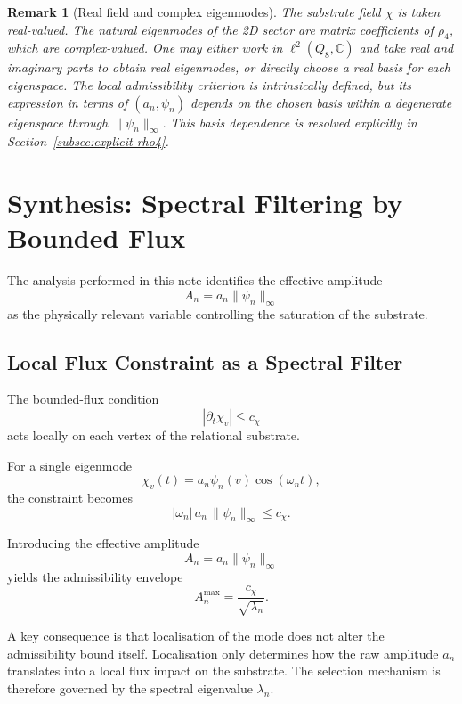 \documentclass[11pt,a4paper]{article}
\newtheorem{remark}{Remark}
\begin{document}
  \begin{remark}[Real field and complex eigenmodes]
      The substrate field $\chi$ is taken real-valued.
      The natural eigenmodes of the 2D sector are matrix coefficients of $\rho_4$,
      which are complex-valued.
      One may either work in $\ell^2(Q_8,\mathbb{C})$ and take real and imaginary parts to
      obtain real eigenmodes, or directly choose a real basis for each eigenspace.
      The local admissibility criterion is intrinsically defined, but its expression in
      terms of $(a_n,\psi_n)$ depends on the chosen basis within a degenerate eigenspace
      through $\|\psi_n\|_\infty$.
      This basis dependence is resolved explicitly in
      Section~\ref{subsec:explicit-rho4}.
  \end{remark}

  \section{Synthesis: Spectral Filtering by Bounded Flux}

  The analysis performed in this note identifies the effective amplitude
  \[
    A_n = a_n \|\psi_n\|_\infty
  \]
  as the physically relevant variable controlling the saturation of the
  substrate.

  \subsection{Local Flux Constraint as a Spectral Filter}

    The bounded-flux condition
    \[
      |\partial_t \chi_v| \le c_\chi
    \]
    acts locally on each vertex of the relational substrate.

    For a single eigenmode
    \[
      \chi_v(t) = a_n \psi_n(v) \cos(\omega_n t),
    \]
    the constraint becomes
    \[
      |\omega_n|\,a_n\,\|\psi_n\|_\infty \le c_\chi.
    \]

    Introducing the effective amplitude
    \[
      A_n = a_n \|\psi_n\|_\infty
    \]
    yields the admissibility envelope
    \[
      A_n^{\max} = \frac{c_\chi}{\sqrt{\lambda_n}}.
    \]

    A key consequence is that localisation of the mode does not alter the
    admissibility bound itself.
    Localisation only determines how the raw amplitude $a_n$ translates into
    a local flux impact on the substrate.
    The selection mechanism is therefore governed by the spectral
    eigenvalue $\lambda_n$.
\end{document}
